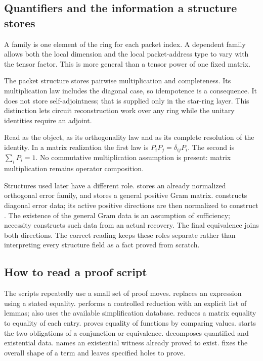 \subsection{Quantifiers and the information a structure stores}
A family  is one element of the ring for each packet index. A dependent family  allows both the local dimension and the local packet-address type to vary with the tensor factor. This is more general than a tensor power of one fixed matrix.

The packet structure stores pairwise multiplication and completeness. Its multiplication law includes the diagonal case, so idempotence is a consequence. It does not store self-adjointness; that is supplied only in the star-ring layer. This distinction lets circuit reconstruction work over any ring while the unitary identities require an adjoint.


Read  as the object,  as its orthogonality law and  as its complete resolution of the identity. In a matrix realization the first law is $P_iP_j=\delta_{ij}P_i$. The second is $\sum_iP_i=1$. No commutative multiplication assumption is present: matrix multiplication remains operator composition.

Structures used later have a different role.  stores an already normalized orthogonal error family, and  stores a general positive Gram matrix.  constructs diagonal error data; its active positive directions are then normalized to construct . The existence of the general Gram data is an assumption of sufficiency; necessity constructs such data from an actual recovery. The final equivalence joins both directions. The correct reading keeps these roles separate rather than interpreting every structure field as a fact proved from scratch.

\subsection{How to read a proof script}
The scripts repeatedly use a small set of proof moves.  replaces an expression using a stated equality.  performs a controlled reduction with an explicit list of lemmas;  also uses the available simplification database.  reduces a matrix equality to equality of each entry.  proves equality of functions by comparing values.  starts the two obligations of a conjunction or equivalence.  decomposes quantified and existential data.  names an existential witness already proved to exist.  fixes the overall shape of a term and leaves specified holes to prove.

